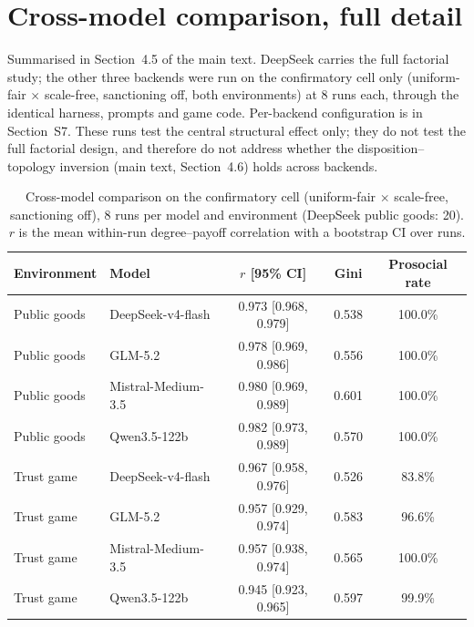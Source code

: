 \documentclass[11pt,a4paper]{article}
\begin{document}
\section{Cross-model comparison, full detail}
\label{sec:s11}

Summarised in Section~4.5 of the main text. DeepSeek carries the full
factorial study; the other three backends were run on the confirmatory
cell only (uniform-fair $\times$ scale-free, sanctioning off, both
environments) at 8 runs each, through the identical harness, prompts
and game code. Per-backend configuration is in Section~S7. These runs
test the central structural effect only; they do not test the full
factorial design, and therefore do not address whether the
disposition--topology inversion (main text, Section~4.6) holds across
backends.

\begin{table}[ht]
\centering
\small
\caption{Cross-model comparison on the confirmatory cell (uniform-fair
$\times$ scale-free, sanctioning off), 8 runs per model and
environment (DeepSeek public goods: 20). $r$ is the mean within-run
degree--payoff correlation with a bootstrap CI over runs.}
\label{tab:crossmodel}
\begin{tabular}{llccc}
\toprule
Environment & Model & $r$ [95\% CI] & Gini & Prosocial rate \\
\midrule
Public goods & DeepSeek-v4-flash & 0.973 [0.968, 0.979] & 0.538 & 100.0\% \\
Public goods & GLM-5.2           & 0.978 [0.969, 0.986] & 0.556 & 100.0\% \\
Public goods & Mistral-Medium-3.5 & 0.980 [0.969, 0.989] & 0.601 & 100.0\% \\
Public goods & Qwen3.5-122b      & 0.982 [0.973, 0.989] & 0.570 & 100.0\% \\
\midrule
Trust game & DeepSeek-v4-flash & 0.967 [0.958, 0.976] & 0.526 & 83.8\% \\
Trust game & GLM-5.2           & 0.957 [0.929, 0.974] & 0.583 & 96.6\% \\
Trust game & Mistral-Medium-3.5 & 0.957 [0.938, 0.974] & 0.565 & 100.0\% \\
Trust game & Qwen3.5-122b      & 0.945 [0.923, 0.965] & 0.597 & 99.9\% \\
\bottomrule
\end{tabular}
\end{table}
\end{document}
